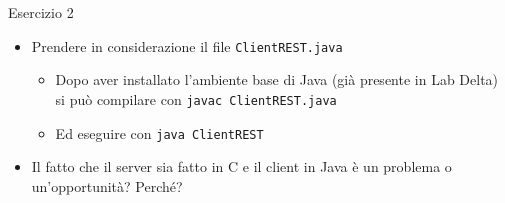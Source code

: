 \documentclass[11pt]{article}
\begin{document}
\begin{tcolorbox}[colback=blue!5!white,colframe=blue!75!black,title=\textbf{DOMANDA}, breakable]
Esercizio 2
\begin{itemize}
    \item Prendere in considerazione il file \texttt{ClientREST.java}
    \begin{itemize}
        \item Dopo aver installato l’ambiente base di Java (già presente in Lab Delta) si può compilare con \texttt{javac ClientREST.java}
        \item Ed eseguire con \texttt{java ClientREST}
    \end{itemize}
    \item Il fatto che il server sia fatto in C e il client in Java è un problema o un’opportunità? Perché?
\end{itemize}
\end{tcolorbox}
\end{document}
